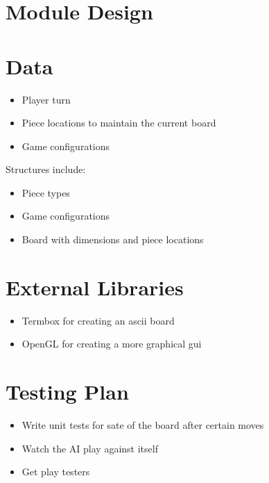 \documentclass{article}
\begin{document}
\section{Module Design}

\section{Data}
\begin{itemize}
\item Player turn
\item Piece locations to maintain the current board
\item Game configurations
\end{itemize}
Structures include:
\begin{itemize}
\item Piece types
\item Game configurations
\item Board with dimensions and piece locations
\end{itemize}

\section{External Libraries}
\begin{itemize}
\item Termbox for creating an ascii board
\item OpenGL for creating a more graphical gui
\end{itemize}

\section{Testing Plan}
\begin{itemize}
\item Write unit tests for sate of the board after certain moves
\item Watch the AI play against itself
\item Get play testers
\end{itemize}
\end{document}
